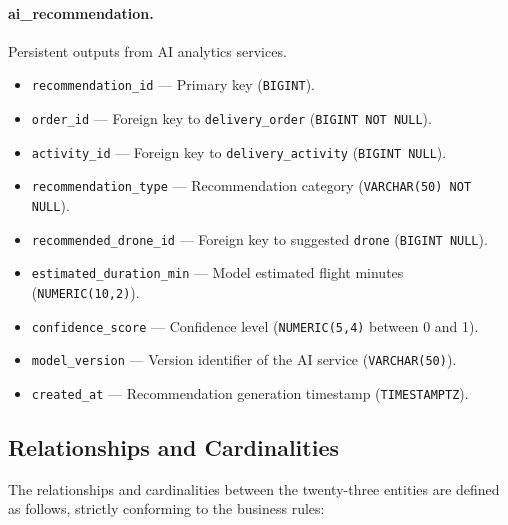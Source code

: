 \paragraph{ai\_recommendation.}
Persistent outputs from AI analytics services.
\begin{itemize}
    \item \texttt{recommendation\_id} — Primary key (\texttt{BIGINT}).
    \item \texttt{order\_id} — Foreign key to \texttt{delivery\_order} (\texttt{BIGINT NOT NULL}).
    \item \texttt{activity\_id} — Foreign key to \texttt{delivery\_activity} (\texttt{BIGINT NULL}).
    \item \texttt{recommendation\_type} — Recommendation category (\texttt{VARCHAR(50) NOT NULL}).
    \item \texttt{recommended\_drone\_id} — Foreign key to suggested \texttt{drone} (\texttt{BIGINT NULL}).
    \item \texttt{estimated\_duration\_min} — Model estimated flight minutes (\texttt{NUMERIC(10,2)}).
    \item \texttt{confidence\_score} — Confidence level (\texttt{NUMERIC(5,4)} between 0 and 1).
    \item \texttt{model\_version} — Version identifier of the AI service (\texttt{VARCHAR(50)}).
    \item \texttt{created\_at} — Recommendation generation timestamp (\texttt{TIMESTAMPTZ}).
\end{itemize}

\subsection{Relationships and Cardinalities}\label{s:relationships}

The relationships and cardinalities between the twenty-three entities are defined as follows, strictly conforming to the business rules:

